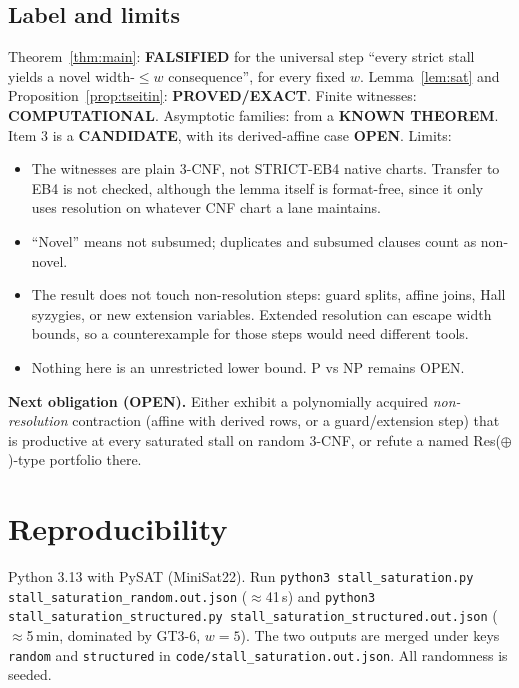 \documentclass[11pt]{article}
\theoremstyle{definition}
\begin{document}
\subsection*{Label and limits}
Theorem~\ref{thm:main}: \textbf{FALSIFIED} for the universal step ``every strict stall yields a novel width-$\le w$ consequence'', for every fixed $w$. Lemma~\ref{lem:sat} and Proposition~\ref{prop:tseitin}: \textbf{PROVED/EXACT}. Finite witnesses: \textbf{COMPUTATIONAL}. Asymptotic families: from a \textbf{KNOWN THEOREM}. Item 3 is a \textbf{CANDIDATE}, with its derived-affine case \textbf{OPEN}. Limits:
\begin{itemize}
\item The witnesses are plain 3-CNF, not STRICT-EB4 native charts. Transfer to EB4 is not checked, although the lemma itself is format-free, since it only uses resolution on whatever CNF chart a lane maintains.
\item ``Novel'' means not subsumed; duplicates and subsumed clauses count as non-novel.
\item The result does not touch non-resolution steps: guard splits, affine joins, Hall syzygies, or new extension variables. Extended resolution can escape width bounds, so a counterexample for those steps would need different tools.
\item Nothing here is an unrestricted lower bound. P vs NP remains OPEN.
\end{itemize}
\textbf{Next obligation (OPEN).} Either exhibit a polynomially acquired \emph{non-resolution} contraction (affine with derived rows, or a guard/extension step) that is productive at every saturated stall on random 3-CNF, or refute a named Res($\oplus$)-type portfolio there.

\section*{Reproducibility}
Python 3.13 with PySAT (MiniSat22). Run \texttt{python3 stall\_saturation.py stall\_saturation\_random.out.json} ($\approx$41\,s) and \texttt{python3 stall\_saturation\_structured.py stall\_saturation\_structured.out.json} ($\approx$5\,min, dominated by GT3-6, $w=5$). The two outputs are merged under keys \texttt{random} and \texttt{structured} in \texttt{code/stall\_saturation.out.json}. All randomness is seeded.
\end{document}
